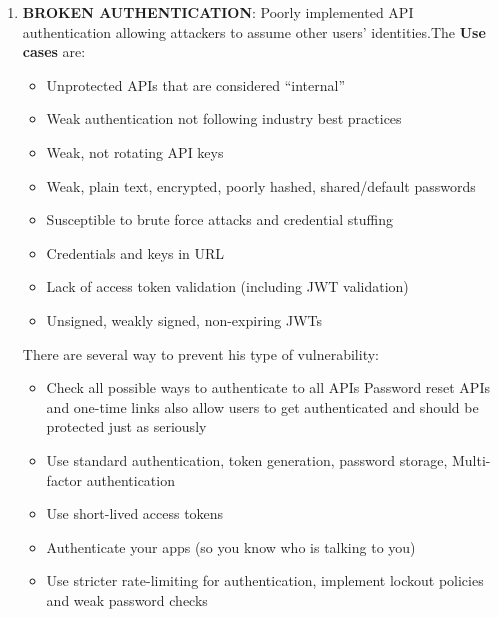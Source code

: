 \documentclass[10pt,a4paper]{report}
\begin{document}
\begin{enumerate}
	\item \textbf{BROKEN AUTHENTICATION}: Poorly implemented API authentication allowing attackers to assume other users’ identities.The \textbf{Use cases} are:
	\begin{itemize}
		\item Unprotected APIs that are considered “internal”
		\item Weak authentication not following industry best practices
		\item Weak, not rotating API keys
		\item Weak, plain text, encrypted, poorly hashed, shared/default
		passwords
		\item Susceptible to brute force attacks and credential stuffing
		\item Credentials and keys in URL
		\item Lack of access token validation (including JWT validation)
		\item Unsigned, weakly signed, non-expiring JWTs
	\end{itemize}
	There are several way to prevent his type of vulnerability:
	\begin{itemize}
		\item Check all possible ways to authenticate to all APIs
		 Password reset APIs and one-time links also allow users to get
		authenticated and should be protected just as seriously
		\item Use standard authentication, token generation, password storage,
		Multi-factor authentication
		\item Use short-lived access tokens
		\item Authenticate your apps (so you know who is talking to you)
		\item Use stricter rate-limiting for authentication, implement lockout
		policies and weak password checks
	\end{itemize}


\end{enumerate}
\end{document}
